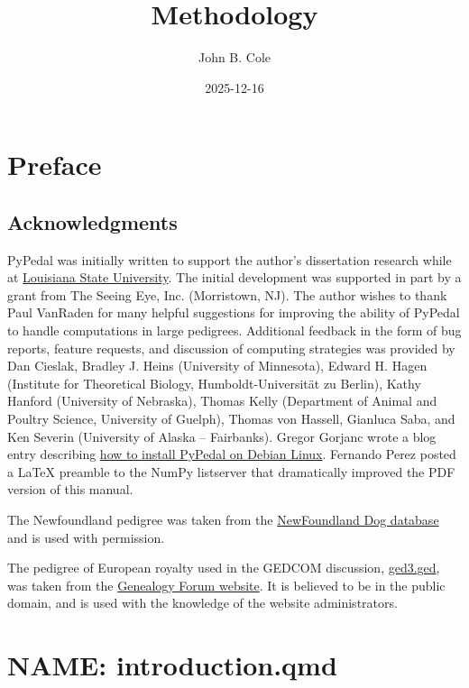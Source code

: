 \documentclass[
  letterpaper,
  DIV=11,
  numbers=noendperiod]{scrreprt}
\title{Methodology}
\author{John B. Cole}
\date{2025-12-16}
\begin{document}
\maketitle



\chapter{Preface}\label{preface}

\section{Acknowledgments}\label{acknowledgments}

PyPedal was initially written to support the author's dissertation
research while at \href{http://www.lsu.edu/}{Louisiana State
University}. The initial development was supported in part by a grant
from The Seeing Eye, Inc. (Morristown, NJ). The author wishes to thank
Paul VanRaden for many helpful suggestions for improving the ability of
PyPedal to handle computations in large pedigrees. Additional feedback
in the form of bug reports, feature requests, and discussion of
computing strategies was provided by Dan Cieslak, Bradley J. Heins
(University of Minnesota), Edward H. Hagen (Institute for Theoretical
Biology, Humboldt-Universität zu Berlin), Kathy Hanford (University of
Nebraska), Thomas Kelly (Department of Animal and Poultry Science,
University of Guelph), Thomas von Hassell, Gianluca Saba, and Ken
Severin (University of Alaska -- Fairbanks). Gregor Gorjanc wrote a blog
entry describing
\href{http://ggorjan.blogspot.com/2007/04/installing-pypedal-under-debian.html}{how
to install PyPedal on Debian Linux}. Fernando Perez posted a LaTeX
preamble to the NumPy listserver that dramatically improved the PDF
version of this manual.

The Newfoundland pedigree was taken from the
\href{http://www.newfoundlanddog-database.net/en/}{NewFoundland Dog
database} and is used with permission.

The pedigree of European royalty used in the GEDCOM discussion,
\href{http://www.genealogyforum.com/gedcom/gedcom1/ged3.htm}{ged3.ged},
was taken from the \href{http://www.genealogyforum.com/}{Genealogy Forum
website}. It is believed to be in the public domain, and is used with
the knowledge of the website administrators.


\chapter{NAME: introduction.qmd}\label{name-introduction.qmd}
\end{document}
